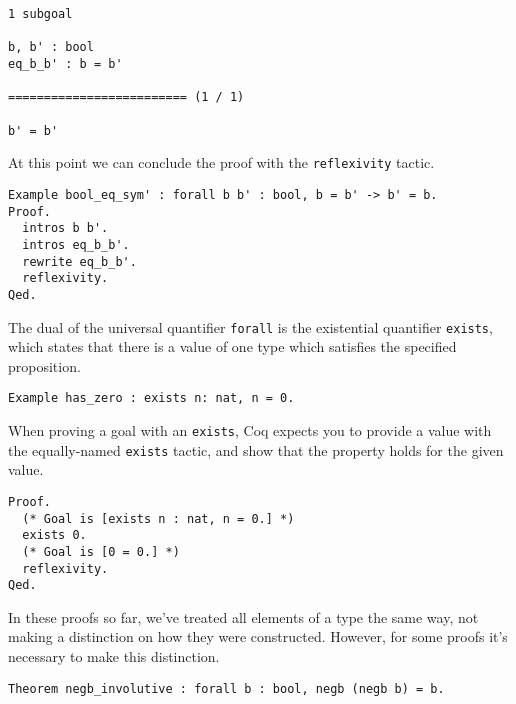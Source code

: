 \begin{verbatim}
1 subgoal

b, b' : bool
eq_b_b' : b = b'

========================= (1 / 1)

b' = b'
\end{verbatim}

At this point we can conclude the proof with the \texttt{reflexivity} tactic.

\begin{verbatim}
Example bool_eq_sym' : forall b b' : bool, b = b' -> b' = b.
Proof.
  intros b b'.
  intros eq_b_b'.
  rewrite eq_b_b'.
  reflexivity.
Qed.
\end{verbatim}

The dual of the universal quantifier \texttt{forall} is the existential quantifier
\texttt{exists}, which states that there is a value of one type which satisfies the specified
proposition.

\begin{verbatim}
Example has_zero : exists n: nat, n = 0.
\end{verbatim}

When proving a goal with an \texttt{exists}, Coq expects you to provide a value with the 
equally-named \texttt{exists} tactic, and show that the property holds for the given value.

\begin{verbatim}
Proof.
  (* Goal is [exists n : nat, n = 0.] *)
  exists 0. 
  (* Goal is [0 = 0.] *)
  reflexivity.
Qed.
\end{verbatim}


In these proofs so far, we've treated all elements of a type the same way, not making a distinction on
how they were constructed. However, for some proofs it's necessary to make this distinction.

\begin{verbatim}
Theorem negb_involutive : forall b : bool, negb (negb b) = b.
\end{verbatim}

